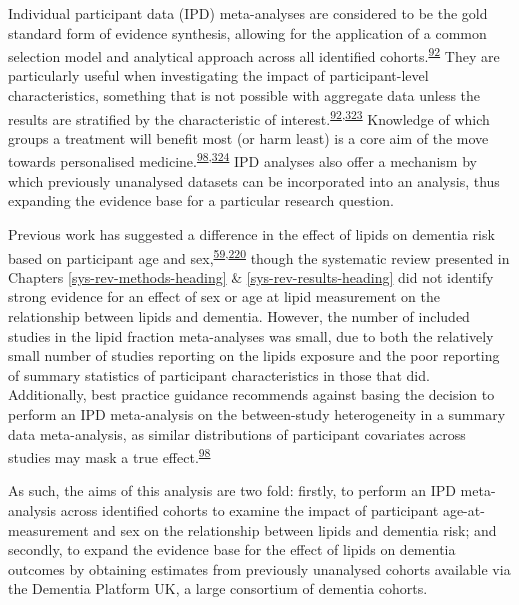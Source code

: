 \documentclass[a4paper, twoside]{templates/ociamthesis}
\begin{document}
Individual participant data (IPD) meta-analyses are considered to be the gold standard form of evidence synthesis, allowing for the application of a common selection model and analytical approach across all identified cohorts.\textsuperscript{\protect\hyperlink{ref-riley2010}{92}} They are particularly useful when investigating the impact of participant-level characteristics, something that is not possible with aggregate data unless the results are stratified by the characteristic of interest.\textsuperscript{\protect\hyperlink{ref-riley2010}{92},\protect\hyperlink{ref-thompson2005}{323}} Knowledge of which groups a treatment will benefit most (or harm least) is a core aim of the move towards personalised medicine.\textsuperscript{\protect\hyperlink{ref-riley2020}{98},\protect\hyperlink{ref-hingorani2013}{324}}
IPD analyses also offer a mechanism by which previously unanalysed datasets can be incorporated into an analysis, thus expanding the evidence base for a particular research question.

Previous work has suggested a difference in the effect of lipids on dementia risk based on participant age and sex,\textsuperscript{\protect\hyperlink{ref-mielke2010}{59},\protect\hyperlink{ref-ancelin2013}{220}} though the systematic review presented in Chapters \ref{sys-rev-methods-heading} \& \ref{sys-rev-results-heading} did not identify strong evidence for an effect of sex or age at lipid measurement on the relationship between lipids and dementia. However, the number of included studies in the lipid fraction meta-analyses was small, due to both the relatively small number of studies reporting on the lipids exposure and the poor reporting of summary statistics of participant characteristics in those that did. Additionally, best practice guidance recommends against basing the decision to perform an IPD meta-analysis on the between-study heterogeneity in a summary data meta-analysis, as similar distributions of participant covariates across studies may mask a true effect.\textsuperscript{\protect\hyperlink{ref-riley2020}{98}}

As such, the aims of this analysis are two fold: firstly, to perform an IPD meta-analysis across identified cohorts to examine the impact of participant age-at-measurement and sex on the relationship between lipids and dementia risk; and secondly, to expand the evidence base for the effect of lipids on dementia outcomes by obtaining estimates from previously unanalysed cohorts available via the Dementia Platform UK, a large consortium of dementia cohorts.
\end{document}
